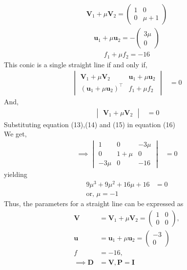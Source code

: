 \documentclass[10pt,a4paper]{report}
\newcommand{\myvec}[1]{\ensuremath{\begin{pmatrix}#1\end{pmatrix}}}
\let\vec\mathbf
\let\vec\mathbf
\newcommand{\mydet}[1]{\ensuremath{\begin{vmatrix}#1\end{vmatrix}}}
\providecommand{\brak}[1]{\ensuremath{\left(#1\right)}}
\begin{document}
\begin{multicols}{2}
\begin{align}
\vec{V}_1+\mu\vec{V}_2= \myvec{
1 & 0\\
0 & \mu+1
}
\end{align}
\begin{align}
\vec{u}_1+\mu\vec{u}_2= -\myvec{
3\mu\\
0
}
\end{align}
\begin{align}
f_1+\mu f_2= -16
\end{align}
This conic is a single straight line if and only if, \\ \vspace{1mm}
\begin{align}
\mydet{\vec{V}_1 + \mu\vec{V}_2 & \vec{u}_1+\mu \vec{u}_2\\ \brak{\vec{u}_1+\mu \vec{u}_2}^{\top} & f_1 + \mu f_2} &= 0
\end{align}
And,\\
\begin{align}
\mydet{\vec{V}_1 + \mu\vec{V}_2} &= 0
\end{align}
Substituting equation (13),(14) and (15) in equation (16)\\ \vspace{1mm}
We get,\\ \vspace{1mm}
\fi
\begin{align}
\implies \mydet{1& 0 & -3\mu\\ 
0 & 1+\mu & 0 \\
-3\mu & 0 & -16
} &= 0
\end{align}
yielding
\begin{align}
	9\mu^3 + 9\mu^2 + 16\mu + 16&=0
	\\
	\text{or, }
    \mu = -1
\end{align}
\iffalse
 Thus, the parameters for a straight line can be expressed as\\ \vspace{1mm}
 \begin{align}
	\vec{V} &= 
\vec{V}_1 + \mu\vec{V}_2
=\myvec{ 1 & 0 \\ 0 & 0},
\\
	\vec{u} &=
\vec{u}_1+\mu \vec{u}_2
	= \myvec{
-3\\
0
    }
\\
	f&=-16,
	\\
	\implies \vec{D} &= \vec{V}, \vec{P} = \vec{I}
    \end{align}
 


\end{multicols}
\end{document}
